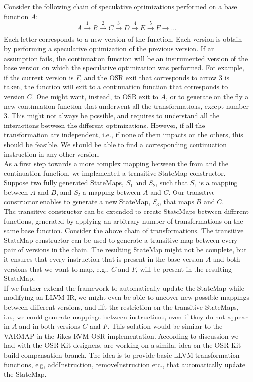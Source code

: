 Consider the following chain of speculative optimizations performed on a base function $A$: 
$$A \xrightarrow[]{1} B \xrightarrow[]{2} C \xrightarrow[]{3} D \xrightarrow[]{4} E \xrightarrow[]{5} F \rightarrow ...$$
Each letter corresponds to a new version of the function. 
Each version is obtain by performing a speculative optimization of the previous version.
If an assumption fails, the continuation function will be an instrumented version of the base version on which the speculative optimization was performed.
For example, if the current version is $F$, and the OSR exit that corresponds to arrow 3 is taken, 
the function will exit to a continuation function that corresponds to version $C$.
One might want, instead, to OSR exit to $A$, or to generate on the fly a new continuation function that underwent all the transformations, except number 3. 
This might not always be possible, and requires to understand all the interactions between the different optimizations.
However, if all the transformation are independent, i.e., if none of them impacts on the others, this should be feasible.
We should be able to find a corresponding continuation instruction in any other version.\\

As a first step towards a more complex mapping between the from and the continuation function, we implemented a transitive StateMap constructor.
Suppose two fully generated StateMaps, $S_1$ and $S_2$, such that $S_1$ is a mapping between $A$ and $B$, and $S_2$ a mapping between $A$ and $C$.
Our transitive constructor enables to generate a new StateMap, $S_3$, that maps $B$ and $C$.\\

The transitive constructor can be extended to create StateMaps between different functions, generated by applying an arbitrary number of transformations on the same base function.
Consider the above chain of transformations.
The transitive StateMap constructor can be used to generate a transitive map between every pair of versions in the chain.
The resulting StateMap might not be complete, but it ensures that every instruction that is present in the base version $A$ and both versions that we want to map, e.g., $C$ and $F$, will be present in the resulting StateMap.\\

If we further extend the framework to automatically update the StateMap while modifying an LLVM IR, we might even be able to uncover new possible mappings between different versions, and lift the restriction on the transitive StateMaps, i.e., we could generate mappings between instructions, even if they do not appear in $A$ and in both versions $C$ and $F$.
This solution would be similar to the VARMAP in the Jikes RVM OSR implementation\cite{soman2006efficient}.
According to discussion we had with the OSR Kit designers,  are working on a similar idea on the OSR Kit build compensation branch\cite{OSRKitGit}.
The idea is to provide basic LLVM transformation functions, e.g, addInstruction, removeInstruction etc., that automatically update the StateMap.\\

